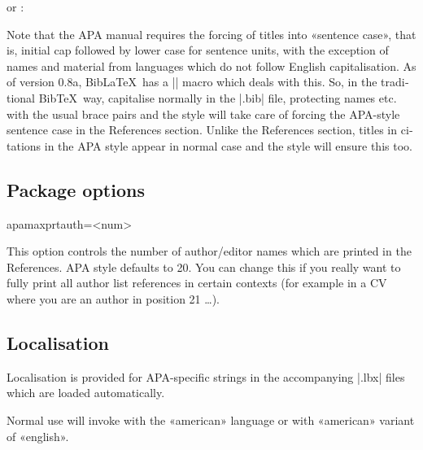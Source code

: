 \documentclass{ltxdockit}
\begin{document}
\begin{ltxcode}
\usepackage[american]{babel}
\usepackage{csquotes}
\usepackage[style=apa]{biblatex}
\end{ltxcode}

or :

\begin{ltxcode}
\usepackage{polyglossia}
\setdefaultlanguage[variant=american]{english}
\usepackage{csquotes}
\usepackage[style=apa]{biblatex}
\end{ltxcode}

\noindent Note that the APA manual requires the forcing of titles into
«sentence case», that is, initial cap followed by lower case for sentence
units, with the exception of names and material from languages which do not
follow English capitalisation. As of version 0.8a, Bib\LaTeX\ has a
|\MakeSentenceCase| macro which deals with this. So, in the traditional
Bib\TeX\ way, capitalise normally in the |.bib| file, protecting names etc.
with the usual brace pairs and the style will take care of forcing the
APA-style sentence case in the References section. Unlike the References
section, titles in citations in the APA style appear in normal case and the
style will ensure this too.

\subsection{Package options}\label{opts}

\begin{ltxcode}
apamaxprtauth=<num>
\end{ltxcode}

\noindent This option controls the number of author/editor names which are
printed in the References. APA style defaults to 20. You can change this if
you really want to fully print all author list references in certain
contexts (for example in a CV where you are an author in position 21 \ldots).

\subsection{Localisation}

Localisation is provided for APA-specific strings in the accompanying
|.lbx| files which are loaded automatically.

Normal use will invoke  with the «american» language or
 with «american» variant of «english».
\end{document}
